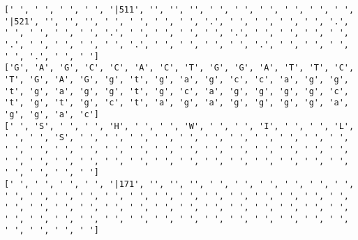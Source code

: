 \documentclass{article}
\begin{document}
\begin{Verbatim}
[' ', ' ', ' ', ' ', '|511', '', '', '', ' ', ' ', ' ', ' ', ' ', ' ', '|521', '', '', '', ' ', ' ', ' ', ' ', '.', ' ', ' ', ' ', ' ', '.', ' ', ' ', ' ', ' ', '.', ' ', ' ', ' ', ' ', '.', ' ', ' ', ' ', ' ', '.', ' ', ' ', ' ', ' ', '.', ' ', ' ', ' ', ' ', '.', ' ', ' ', ' ', ' ', '.', ' ', ' ']
['G', 'A', 'G', 'C', 'C', 'A', 'C', 'T', 'G', 'G', 'A', 'T', 'T', 'C', 'T', 'G', 'A', 'G', 'g', 't', 'g', 'a', 'g', 'c', 'c', 'a', 'g', 'g', 't', 'g', 'a', 'g', 'g', 't', 'g', 'c', 'a', 'g', 'g', 'g', 'g', 'c', 't', 'g', 't', 'g', 'c', 't', 'a', 'g', 'a', 'g', 'g', 'g', 'g', 'a', 'g', 'g', 'a', 'c']
[' ', 'S', ' ', ' ', 'H', ' ', ' ', 'W', ' ', ' ', 'I', ' ', ' ', 'L', ' ', ' ', 'S', ' ', ' ', ' ', ' ', ' ', ' ', ' ', ' ', ' ', ' ', ' ', ' ', ' ', ' ', ' ', ' ', ' ', ' ', ' ', ' ', ' ', ' ', ' ', ' ', ' ', ' ', ' ', ' ', ' ', ' ', ' ', ' ', ' ', ' ', ' ', ' ', ' ', ' ', ' ', ' ', ' ', ' ', ' ']
[' ', ' ', ' ', ' ', '|171', '', '', '', ' ', ' ', ' ', ' ', ' ', ' ', ' ', ' ', ' ', ' ', ' ', ' ', ' ', ' ', ' ', ' ', ' ', ' ', ' ', ' ', ' ', ' ', ' ', ' ', ' ', ' ', ' ', ' ', ' ', ' ', ' ', ' ', ' ', ' ', ' ', ' ', ' ', ' ', ' ', ' ', ' ', ' ', ' ', ' ', ' ', ' ', ' ', ' ', ' ', ' ', ' ', ' ']
  

\end{Verbatim}
\end{document}
